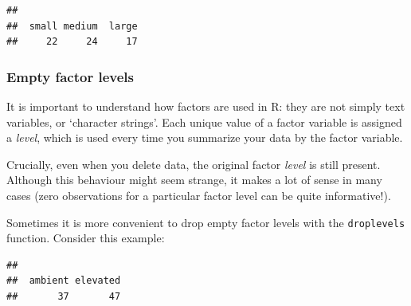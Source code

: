 \documentclass[]{book}
\newenvironment{Shaded}{\begin{snugshade}}{\end{snugshade}}
\newcommand{\CommentTok}[1]{\textcolor[rgb]{0.56,0.35,0.01}{\textit{#1}}}
\newcommand{\KeywordTok}[1]{\textcolor[rgb]{0.13,0.29,0.53}{\textbf{#1}}}
\newcommand{\NormalTok}[1]{#1}
\newcommand{\OperatorTok}[1]{\textcolor[rgb]{0.81,0.36,0.00}{\textbf{#1}}}
\newcommand{\StringTok}[1]{\textcolor[rgb]{0.31,0.60,0.02}{#1}}
\begin{document}
\begin{verbatim}
## 
##  small medium  large 
##     22     24     17
\end{verbatim}

\hypertarget{empty-factor-levels}{%
\subsubsection{Empty factor levels}\label{empty-factor-levels}}

It is important to understand how factors are used in R: they are not simply text variables, or `character strings'. Each unique value of a factor variable is assigned a \emph{level}, which is used every time you summarize your data by the factor variable.

Crucially, even when you delete data, the original factor \emph{level} is still present. Although this behaviour might seem strange, it makes a lot of sense in many cases (zero observations for a particular factor level can be quite informative!).

Sometimes it is more convenient to drop empty factor levels with the \texttt{droplevels} function. Consider this example:

\begin{Shaded}
\end{Shaded}

\begin{verbatim}
## 
##  ambient elevated 
##       37       47
\end{verbatim}

\begin{Shaded}
\end{Shaded}
\end{document}
